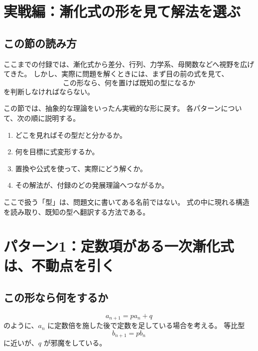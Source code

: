 
% 

\section{実戦編：漸化式の形を見て解法を選ぶ}

\subsection*{この節の読み方}

ここまでの付録では、漸化式から差分、行列、力学系、母関数などへ視野を広げてきた。
しかし、実際に問題を解くときには、まず目の前の式を見て、
\[
  \text{この形なら、何を置けば既知の型になるか}
\]
を判断しなければならない。

この節では、抽象的な理論をいったん実戦的な形に戻す。
各パターンについて、次の順に説明する。

\begin{enumerate}
  \item どこを見ればその型だと分かるか。
  \item 何を目標に式変形するか。
  \item 置換や公式を使って、実際にどう解くか。
  \item その解法が、付録のどの発展理論へつながるか。
\end{enumerate}

ここで扱う「型」は、問題文に書いてある名前ではない。
式の中に現れる構造を読み取り、既知の型へ翻訳する方法である。

\section{パターン1：定数項がある一次漸化式は、不動点を引く}

\subsection{この形なら何をするか}

\[
  a_{n+1}=pa_n+q
\]
のように、$a_n$ に定数倍を施した後で定数を足している場合を考える。
等比型
\[
  b_{n+1}=pb_n
\]
に近いが、$q$ が邪魔をしている。

